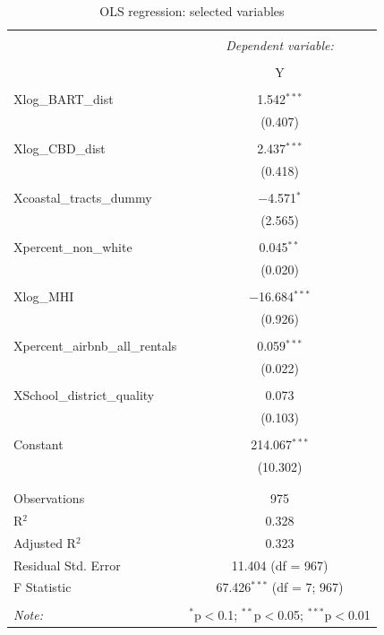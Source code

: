 \documentclass[10pt, letterpaper]{amsart}
\begin{document}
\begin{table}[!htbp] \centering 
  \caption{OLS regression: selected variables} 
  \label{} 
  \begin{tabular}{@{\extracolsep{5pt}}lc} 
    \\[-1.8ex]\hline 
    \hline \\[-1.8ex] 
    & \multicolumn{1}{c}{\textit{Dependent variable:}} \\ 
    \cline{2-2} 
    \\[-1.8ex] & Y \\ 
    \hline \\[-1.8ex] 
    Xlog\_BART\_dist & 1.542$^{***}$ \\ 
    & (0.407) \\ 
    & \\ 
    Xlog\_CBD\_dist & 2.437$^{***}$ \\ 
    & (0.418) \\ 
    & \\ 
    Xcoastal\_tracts\_dummy & $-$4.571$^{*}$ \\ 
    & (2.565) \\ 
    & \\ 
    Xpercent\_non\_white & 0.045$^{**}$ \\ 
    & (0.020) \\ 
    & \\ 
    Xlog\_MHI & $-$16.684$^{***}$ \\ 
    & (0.926) \\ 
    & \\ 
    Xpercent\_airbnb\_all\_rentals & 0.059$^{***}$ \\ 
    & (0.022) \\ 
    & \\ 
    XSchool\_district\_quality & 0.073 \\ 
    & (0.103) \\ 
    & \\ 
    Constant & 214.067$^{***}$ \\ 
    & (10.302) \\ 
    & \\ 
    \hline \\[-1.8ex] 
    Observations & 975 \\ 
    R$^{2}$ & 0.328 \\ 
    Adjusted R$^{2}$ & 0.323 \\ 
    Residual Std. Error & 11.404 (df = 967) \\ 
    F Statistic & 67.426$^{***}$ (df = 7; 967) \\ 
    \hline 
    \hline \\[-1.8ex] 
    \textit{Note:}  & \multicolumn{1}{r}{$^{*}$p$<$0.1; $^{**}$p$<$0.05; $^{***}$p$<$0.01} \\ 
  \end{tabular} 
\end{table} 
\end{document}
